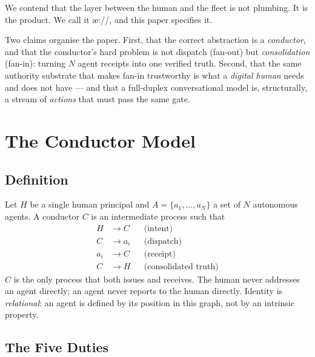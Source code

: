 \documentclass[11pt]{article}
\begin{document}
We contend that the layer between the human and the fleet is not plumbing. It is
the product. We call it \ae://, and this paper specifies it.

Two claims organise the paper. First, that the correct abstraction is a
\emph{conductor}, and that the conductor's hard problem is not dispatch (fan-out)
but \emph{consolidation} (fan-in): turning $N$ agent receipts into one verified
truth. Second, that the same authority substrate that makes fan-in trustworthy is
what a \emph{digital human} needs and does not have --- and that a full-duplex
conversational model is, structurally, a stream of \emph{actions} that must pass
the same gate.

\section{The Conductor Model}

\subsection{Definition}

Let $H$ be a single human principal and $A=\{a_1,\dots,a_N\}$ a set of $N$
autonomous agents. A conductor $C$ is an intermediate process such that
\begin{align}
  H &\rightarrow C && \text{(intent)} \\
  C &\rightarrow a_i && \text{(dispatch)} \\
  a_i &\rightarrow C && \text{(receipt)} \\
  C &\rightarrow H && \text{(consolidated truth)}
\end{align}
$C$ is the only process that both issues and receives. The human never addresses
an agent directly; an agent never reports to the human directly. Identity is
\emph{relational}: an agent is defined by its position in this graph, not by an
intrinsic property.

\subsection{The Five Duties}
\end{document}

